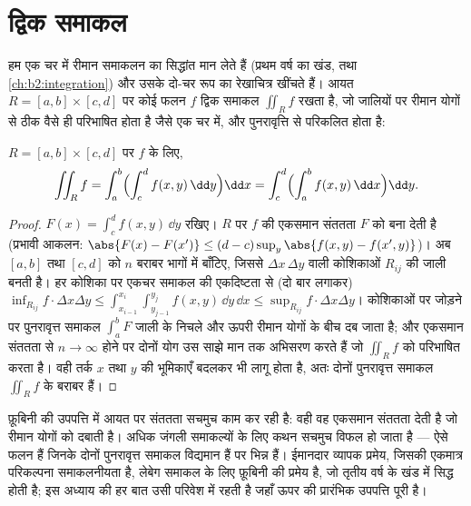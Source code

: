 \section{द्विक समाकल}

हम एक चर में रीमान समाकलन का सिद्धांत मान लेते हैं (प्रथम वर्ष का
खंड, तथा \cref{ch:b2:integration}) और उसके दो-चर रूप का रेखाचित्र खींचते हैं। आयत $R = [a, b] \times [c, d]$
पर  कोई फलन $f$ द्विक समाकल $\iint_R f$ रखता है, जो जालियों पर रीमान
योगों से ठीक वैसे ही परिभाषित होता है जैसे एक चर में, और पुनरावृत्ति
से परिकलित होता है:

\begin{theorem}[आयत पर फ़ूबिनी]\label{thm:b2:multint:fubini}
$R = [a,b] \times [c,d]$ पर  $f$ के लिए,
\[
\iint_R f
= \int_a^b \Bigl(\int_c^d f(x, y)\,\dd y\Bigr)\dd x
= \int_c^d \Bigl(\int_a^b f(x, y)\,\dd x\Bigr)\dd y .
\]
\end{theorem}

\begin{proof}
$F(x) = \int_c^d f(x, y)\,\dd y$ रखिए।  $R$ पर $f$ की एकसमान संततता $F$ को  बना देती
है (प्रभावी आकलन: $\abs{F(x) - F(x')} \leq (d - c)\sup_y\abs{f(x,y) - f(x',y)}$)। अब $[a,b]$ तथा $[c,d]$ को $n$ बराबर भागों में
बाँटिए, जिससे  $\Delta x\,\Delta y$ वाली कोशिकाओं $R_{ij}$ की जाली बनती है।
हर कोशिका पर एकचर समाकल की एकदिष्टता से (दो बार लगाकर) $\inf_{R_{ij}} f \cdot \Delta x \Delta y \leq
\int_{x_{i-1}}^{x_i}\int_{y_{j-1}}^{y_j} f(x,y)\,\dd y\,\dd x \leq
\sup_{R_{ij}} f \cdot \Delta x \Delta y$।
कोशिकाओं पर जोड़ने पर पुनरावृत्त समाकल $\int_a^b F$ जाली के निचले और ऊपरी
रीमान योगों के बीच दब जाता है; और एकसमान संततता से $n \to
\infty$ होने पर
दोनों योग उस साझे मान तक अभिसरण करते हैं जो $\iint_R f$ को परिभाषित करता
है। वही तर्क $x$ तथा $y$ की भूमिकाएँ बदलकर भी लागू होता है, अतः
दोनों पुनरावृत्त समाकल $\iint_R f$ के बराबर हैं।
\end{proof}

\begin{remark}
फ़ूबिनी की उपपत्ति में  आयत पर संततता सचमुच काम कर रही है: वही
वह एकसमान संततता देती है जो रीमान योगों को दबाती है। अधिक जंगली
समाकल्यों के लिए कथन सचमुच विफल हो जाता है --- ऐसे फलन हैं जिनके
दोनों पुनरावृत्त समाकल विद्यमान हैं पर भिन्न हैं। ईमानदार व्यापक
प्रमेय, जिसकी एकमात्र परिकल्पना समाकलनीयता है, लेबेग समाकल के लिए
फ़ूबिनी की प्रमेय है, जो तृतीय वर्ष के खंड में सिद्ध होती है; इस
अध्याय की हर बात उसी  परिवेश में रहती है जहाँ ऊपर की प्रारंभिक
उपपत्ति पूरी है।
\end{remark}

